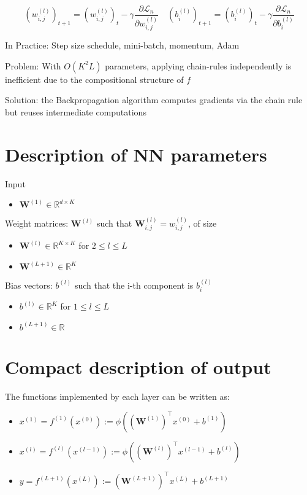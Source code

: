 $$
\left(w_{i, j}^{(l)}\right)_{t+1}=\left(w_{i, j}^{(l)}\right)_{t}-\gamma \frac{\partial \mathscr{L}_{n}}{\partial w_{i, j}^{(l)}} \quad\left(b_{i}^{(l)}\right)_{t+1}=\left(b_{i}^{(l)}\right)_{t}-\gamma \frac{\partial \mathscr{L}_{n}}{\partial b_{i}^{(l)}}
$$

In Practice: Step size schedule, mini-batch, momentum, Adam

Problem: With $O\left(K^{2} L\right)$ parameters, applying chain-rules independently is inefficient due to the compositional structure of $f$

Solution: the Backpropagation algorithm computes gradients via the chain rule but reuses intermediate computations

\section*{Description of NN parameters}
Input



\begin{itemize}
  \item $\mathbf{W}^{(1)} \in \mathbb{R}^{d \times K}$
\end{itemize}



Weight matrices: $\mathbf{W}^{(l)}$ such that $\mathbf{W}_{i, j}^{(l)}=w_{i, j}^{(l)}$, of size

\begin{itemize}
  \item $\mathbf{W}^{(l)} \in \mathbb{R}^{K \times K}$ for $2 \leq l \leq L$
  \item $\mathbf{W}^{(L+1)} \in \mathbb{R}^{K}$
\end{itemize}

Bias vectors: $b^{(l)}$ such that the i-th component is $b_{i}^{(l)}$

\begin{itemize}
  \item $b^{(l)} \in \mathbb{R}^{K}$ for $1 \leq l \leq L$
  \item $b^{(L+1)} \in \mathbb{R}$
\end{itemize}

\section*{Compact description of output}
The functions implemented by each layer can be written as:

\begin{itemize}
  \item $x^{(1)}=f^{(1)}\left(x^{(0)}\right):=\phi\left(\left(\mathbf{W}^{(1)}\right)^{\top} x^{(0)}+b^{(1)}\right)$
  \item $x^{(l)}=f^{(l)}\left(x^{(l-1)}\right):=\phi\left(\left(\mathbf{W}^{(l)}\right)^{\top} x^{(l-1)}+b^{(l)}\right)$
  \item $y=f^{(L+1)}\left(x^{(L)}\right):=\left(\mathbf{W}^{(L+1)}\right)^{\top} x^{(L)}+b^{(L+1)}$
\end{itemize}

